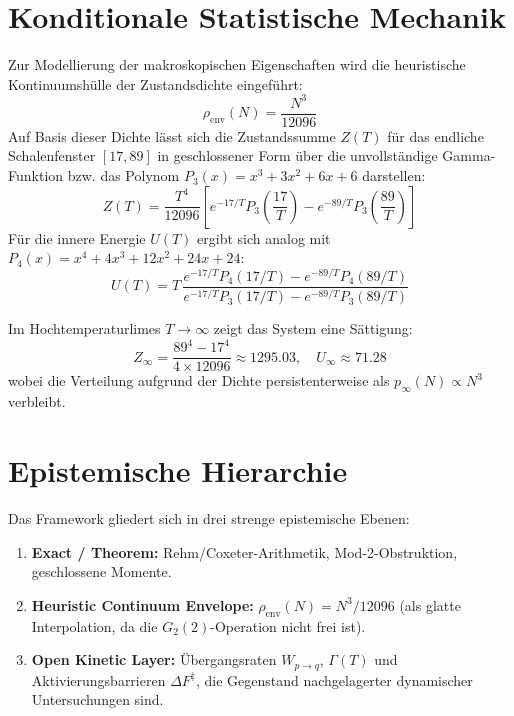 \documentclass[11pt,a4paper]{article}
\begin{document}
	\section{Konditionale Statistische Mechanik}
	
	Zur Modellierung der makroskopischen Eigenschaften wird die heuristische Kontinuumshülle der Zustandsdichte eingeführt:
	\begin{equation}
		\rho_{\text{env}}(N) = \frac{N^3}{12096}
	\end{equation}
	Auf Basis dieser Dichte lässt sich die Zustandssumme $Z(T)$ für das endliche Schalenfenster $[17, 89]$ in geschlossener Form über die unvollständige Gamma-Funktion bzw. das Polynom $P_3(x) = x^3 + 3x^2 + 6x + 6$ darstellen:
	\begin{equation}
		Z(T) = \frac{T^4}{12096} \left[ e^{-17/T} P_3\left(\frac{17}{T}\right) - e^{-89/T} P_3\left(\frac{89}{T}\right) \right]
	\end{equation}
	Für die innere Energie $U(T)$ ergibt sich analog mit $P_4(x) = x^4 + 4x^3 + 12x^2 + 24x + 24$:
	\begin{equation}
		U(T) = T \, \frac{e^{-17/T}P_4(17/T) - e^{-89/T}P_4(89/T)}{e^{-17/T}P_3(17/T) - e^{-89/T}P_3(89/T)}
	\end{equation}
	
	Im Hochtemperaturlimes $T \to \infty$ zeigt das System eine Sättigung:
	\begin{equation}
		Z_\infty = \frac{89^4 - 17^4}{4 \times 12096} \approx 1295.03, \quad U_\infty \approx 71.28
	\end{equation}
	wobei die Verteilung aufgrund der Dichte persistenterweise als $p_\infty(N) \propto N^3$ verbleibt.
	
	\section{Epistemische Hierarchie}
	
	Das Framework gliedert sich in drei strenge epistemische Ebenen:
	\begin{enumerate}
		\item \textbf{Exact / Theorem:} Rehm/Coxeter-Arithmetik, Mod-2-Obstruktion, geschlossene Momente.
		\item \textbf{Heuristic Continuum Envelope:} $\rho_{\text{env}}(N) = N^3 / 12096$ (als glatte Interpolation, da die $G_2(2)$-Operation nicht frei ist).
		\item \textbf{Open Kinetic Layer:} Übergangsraten $W_{p \to q}$, $\Gamma(T)$ und Aktivierungsbarrieren $\Delta F^\ddagger$, die Gegenstand nachgelagerter dynamischer Untersuchungen sind.
	\end{enumerate}
	
\end{document}
